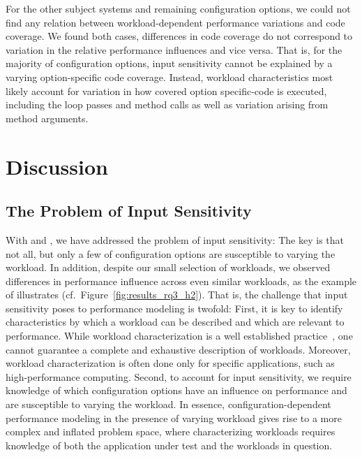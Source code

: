 For the other subject systems and remaining configuration options, we could not find any relation between workload-dependent performance variations and code coverage. We found both cases, differences in code coverage do not correspond to variation in the relative performance influences and vice versa. That is, for the majority of configuration options, input sensitivity cannot be explained by a varying option-specific code coverage. Instead, workload characteristics most likely account for variation in how covered option specific-code is executed, including the loop passes and method calls as well as variation arising from method arguments.
\vspace{1mm}

\section{Discussion}\label{sec:discussion}
\subsection{The Problem of Input Sensitivity}\label{sec:discusssion_challenge}
With  and , we have addressed the problem of input sensitivity: The key is that not all, but only a few of configuration options are susceptible to varying the workload. In addition, despite our small selection of workloads, we observed differences in performance influence across even similar workloads, as the example of \htwo illustrates (cf.~Figure~\ref{fig:results_rq3_h2}). That is, the challenge that input sensitivity poses to performance modeling is twofold: First, it is key to identify characteristics by which a workload can be described and which are relevant to performance. While workload characterization is a well established practice~\cite{ceesay2020,papadopoulos2021}, one cannot guarantee a complete and exhaustive description of workloads. Moreover, workload characterization is often done only for specific applications, such as high-performance computing. Second, to account for input sensitivity, we require knowledge of which configuration options have an influence on performance and are susceptible to varying the workload. In essence, configuration-dependent performance modeling in the presence of varying workload gives rise to a more complex and inflated problem space, where characterizing workloads requires knowledge of both the application under test and the workloads in question.

